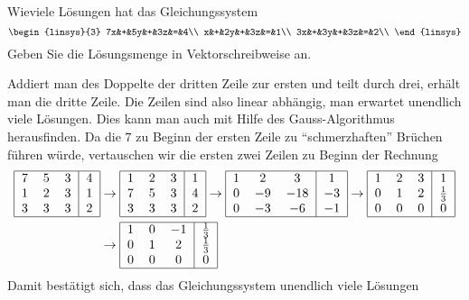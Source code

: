 Wieviele Lösungen hat das Gleichungssystem
\[
\begin{linsys}{3}
7x&+&5y&+&3z&=&4\\
x&+&2y&+&3z&=&1\\
3x&+&3y&+&3z&=&2\\
\end{linsys}
\]
Geben Sie die Lösungsmenge in Vektorschreibweise an.

\begin{loesung}
Addiert man des Doppelte der dritten Zeile zur ersten und teilt
durch drei, erhält man die dritte Zeile. Die Zeilen sind also
linear abhängig, man erwartet
unendlich viele Lösungen. Dies kann man auch mit Hilfe des
Gauss-Algorithmus herausfinden. Da die $7$ zu Beginn der ersten
Zeile zu ``schmerzhaften'' Brüchen führen würde, vertauschen
wir die ersten zwei Zeilen zu Beginn der Rechnung
\begin{align*}
\begin{tabular}{|ccc|c|}
\hline
7&5&3&4\\
1&2&3&1\\
3&3&3&2\\
\hline
\end{tabular}
&\rightarrow
\begin{tabular}{|ccc|c|}
\hline
1&2&3&1\\
7&5&3&4\\
3&3&3&2\\
\hline
\end{tabular}
\rightarrow
\begin{tabular}{|ccc|c|}
\hline
1&2&3&1\\
0&$-9$&$-18$&$-3$\\
0&$-3$&$-6$&$-1$\\
\hline
\end{tabular}
\rightarrow
\begin{tabular}{|ccc|c|}
\hline
1&2&3&1\\
0&1&2&$\frac13$\\
0&0&0&0\\
\hline
\end{tabular}
\\
&\rightarrow
\begin{tabular}{|ccc|c|}
\hline
1&0&$-1$&$\frac13$\\
0&1&2&$\frac13$\\
0&0&0&0\\
\hline
\end{tabular}
\end{align*}
Damit bestätigt sich, dass das Gleichungssystem unendlich viele Lösungen

\end{loesung}
